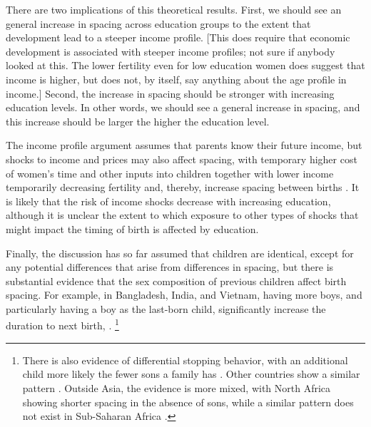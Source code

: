 There are two implications of this theoretical results.
First, we should see an general increase in spacing across education groups to the extent that
development lead to a steeper income profile.
[This does require that economic development is associated with steeper income profiles;
not sure if anybody looked at this.
The lower fertility even for low education women does suggest that income is higher,
but does not, by itself, say anything about the age profile in income.]
Second, the increase in spacing should be stronger with increasing education levels.
In other words, we should see a general increase in spacing, and this increase should be
larger the higher the education level.

The income profile argument assumes that parents know their future income, but 
shocks to income and prices may also affect spacing, with temporary higher cost of women's time
and other inputs into children together with lower income temporarily decreasing fertility 
and, thereby, increase spacing between births \citep{Moffitt1984,Hotz1988,Portner2001,Alam2018}.
It is likely that the risk of income shocks decrease with increasing education, although it
is unclear the extent to which exposure to other types of shocks that might impact the timing
of birth is affected by education.


Finally, the discussion has so far assumed that children are identical, except for any potential
differences that arise from differences in spacing, but there is substantial evidence that the 
sex composition of previous children affect birth spacing.
For example, in Bangladesh, India, and Vietnam, having more boys, and particularly having 
a boy as the last-born child, significantly increase the duration to next birth,
\citep{Haughton1995,Haughton1996,Rahman1993,Bhalotra2008,Kumar2016,Soest2018}.%
\footnote{
There is also evidence of differential stopping behavior, with an additional child more likely the
fewer sons a family has 
\citep{repetto72,Das1987,Arnold1997,arnold98,clark00,Basu2010,Barcellos2014}.%
Other countries show a similar pattern
\citep[see, for example,][]{larsen98,filmer09,Altindag2016}.
Outside Asia, the evidence is more mixed, with North Africa showing shorter spacing in the 
absence of sons, while a similar pattern does not exist in Sub-Saharan Africa 
\citep{Rossi2015}.
}

